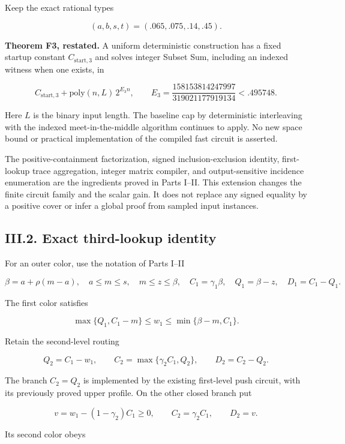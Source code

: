 Keep the exact rational types

\[
(a,b,s,t)=(.065,.075,.14,.45).
\]

\textbf{Theorem F3, restated.} A uniform deterministic construction has a fixed startup constant \(C_{\mathrm{start},3}\) and solves integer Subset Sum, including an indexed witness when one exists, in

\[
C_{\mathrm{start},3}+\mathrm{poly}(n,L)\,
 2^{E_3n},
\qquad
E_3=\frac{158153814247997}{319021177919134}
 < .495748.
\tag{T1}
\]

Here \(L\) is the binary input length. The baseline cap by deterministic interleaving with the indexed meet-in-the-middle algorithm continues to apply. No new space bound or practical implementation of the compiled fast circuit is asserted.

The positive-containment factorization, signed inclusion-exclusion identity, first-lookup trace aggregation, integer matrix compiler, and output-sensitive incidence enumeration are the ingredients proved in Parts I--II. This extension changes the finite circuit family and the scalar gain. It does not replace any signed equality by a positive cover or infer a global proof from sampled input instances.

\hypertarget{af-a9ec399514-iii.2.-exact-third-lookup-identity}{%
\subsection{III.2. Exact third-lookup identity}\label{af-a9ec399514-iii.2.-exact-third-lookup-identity}}

For an outer color, use the notation of Parts I--II

\[
\beta=a+\rho(m-a),\quad
a\le m\le s,\quad m\le z\le\beta,\quad
C_1=\gamma_1\beta,\quad Q_1=\beta-z,\quad D_1=C_1-Q_1.
\]

The first color satisfies

\[
\max\{Q_1,C_1-m\}\le w_1\le\min\{\beta-m,C_1\}.
\]

Retain the second-level routing

\[
Q_2=C_1-w_1,\qquad
C_2=\max\{\gamma_2 C_1,Q_2\},\qquad D_2=C_2-Q_2.
\]

The branch \(C_2=Q_2\) is implemented by the existing first-level push circuit, with its previously proved upper profile. On the other closed branch put

\[
v=w_1-(1-\gamma_2)C_1\ge0,\qquad
C_2=\gamma_2C_1,\qquad D_2=v.
\]

Its second color obeys

